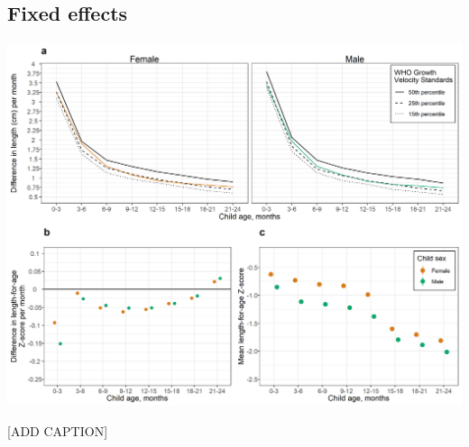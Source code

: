 \documentclass[9pt,]{book}
\begin{document}
\hypertarget{fixed-effects-4}{%
\subsection{Fixed effects}\label{fixed-effects-4}}

\includegraphics[width=41.67in]{figure-copies/fig-stunt-2-vel-overall--allage-fe}

{[}ADD CAPTION{]}


\end{document}

